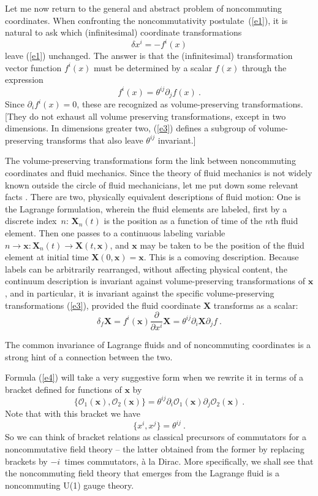 \documentclass[a4paper,12pt,twoside]{article}
\newcommand{\numeq}[2]{\begin{equation}
#2
\label{#1}
\end{equation}}
\newcommand{\refeq}[1]{(\ref{#1})}
\let\vec\boldsymbol
\begin{document}
Let me now return to the general and abstract problem of noncommuting coordinates. 
When confronting the noncommutativity postulate~\refeq{e1}, it is natural to ask which
(infinitesimal) coordinate transformations 
\numeq{e2}{
\delta x^i = -f^i (x) 
}
leave \refeq{e1} unchanged. 
The answer is that the (infinitesimal) transformation vector function $f^i(x)$ must be
determined by a scalar $f(x)$ through the expression~\cite{r3}
\numeq{e3}{
f^i (x) = \theta^{ij} \partial_j f(x) \ . 
}
Since $\partial_i f^i(x) = 0$,   these are recognized as volume-preserving transformations.
[They do not exhaust all volume preserving transformations, except in two dimensions. In
dimensions greater  two,
\refeq{e3} defines a subgroup of volume-preserving transforms that also leave $\theta^{ij}$
invariant.]

The volume-preserving transformations form the link between noncommuting coordinates
and fluid mechanics. Since the theory of fluid mechanics is not widely known outside the circle
of fluid mechanicians, let me put down some relevant facts \cite{r4}.  There are two, physically
equivalent descriptions of fluid motion: One is the Lagrange formulation, wherein the fluid
elements are labeled, first by a discrete index~$n$: $\vec X_n(t)$ is the position as a function of
time of the $n$th fluid element.  Then one passes to a continuous labeling variable $n \to \vec
x: \vec X_n(t)\to \vec X (t,\vec  x)$, and 
$\vec x$ may be taken to be the position of the fluid element at initial time $\vec X(0,\vec x) =
\vec x$. This is a comoving description. Because labels can be arbitrarily rearranged, without
affecting physical content, the continuum description is invariant against volume-preserving
transformations of $\vec x$, and in particular, it is invariant against the specific
volume-preserving transformations
\refeq{e3}, provided the fluid coordinate $\vec X$ transforms as a scalar:
\numeq{e4}{
\delta_f  \vec X  = f^i (\vec x) \frac\partial{\partial x^i} \vec X = \theta^{ij} \partial_i \vec
X\partial_j f\ . 
 }

The common invariance of Lagrange fluids and of noncommuting coordinates is a strong hint of
a connection between the two.

Formula \refeq{e4} will take  a very suggestive form when we rewrite it in terms of a bracket
defined for functions of $\vec x$ by 
\numeq{e5}{
\bigl\{ \mathcal O_1(\vec x), \mathcal O_2(\vec x)\bigr\} =\theta^{ij} \partial_i\mathcal
O_1(\vec x)
\partial_j\mathcal O_2(\vec x)\ .
} 
Note that with this bracket we have
\numeq{e6}{
\bigl\{x^i,  x^j\bigr\} = \theta^{ij}\ .
} 
So we can think of bracket relations as classical precursors of commutators for a
noncommutative field theory -- the latter obtained from the former by replacing brackets by
$-i$~times commutators, \`a la Dirac. More specifically, we shall see that the noncommuting field
theory that emerges from the Lagrange fluid is a noncommuting U(1) gauge theory. 
\end{document}
